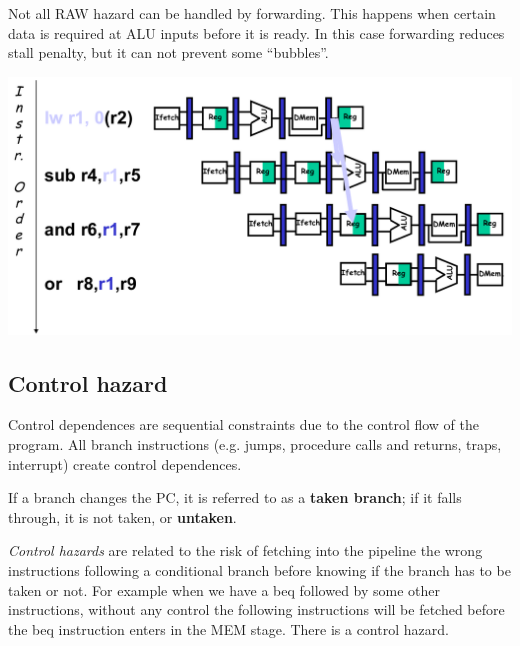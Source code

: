 Not all RAW hazard can be handled by forwarding. This happens when certain data is required at ALU inputs before it is ready. In this case forwarding reduces stall penalty, but it can not prevent some “bubbles”.

\includegraphics[width=\textwidth]{images/pipeline_scheme_forwarding.png}

\subsection{Control hazard}
Control dependences are sequential constraints due to the control flow of the program.
All branch instructions (e.g. jumps, procedure calls and returns, traps, interrupt) create control dependences.

If a branch changes the PC, it is referred to as a \textbf{taken branch}; if it falls through, it is not taken, or \textbf{untaken}.

\textit{Control hazards} are related to the risk of fetching into the pipeline the wrong instructions following a conditional branch before knowing if the branch has to be taken or not.
For example when we have a beq followed by some other instructions, without any control the following instructions will be fetched before the beq instruction enters in the MEM stage. There is a control hazard.


